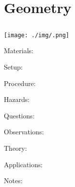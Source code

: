 \section{Geometry}

\begin{multicols}{2}


\section*{}


\subsection{}

\begin{center}
\texttt{[image: ./img/.png]}
\end{center}

\begin{description*}
\item[Materials:]{}
\item[Setup:]{}
\item[Procedure:]{}
\item[Hazards:]{}
\item[Questions:]{}
\item[Observations:]{}
\item[Theory:]{}
\item[Applications:]{}
\item[Notes:]{}
\end{description*}



\end{multicols}

\pagebreak